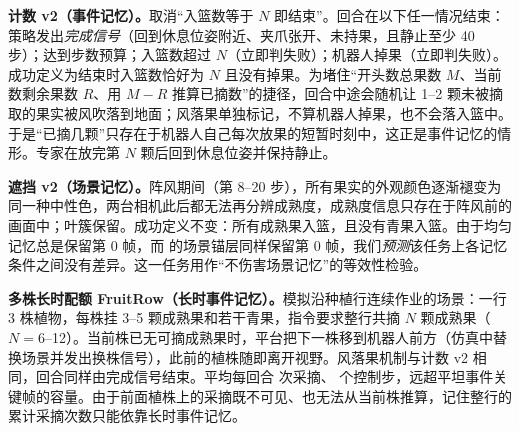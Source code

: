 \textbf{计数 v2（事件记忆）。}取消“入篮数等于 $N$ 即结束”。回合在以下任一情况结束：策略发出\emph{完成信号}（回到休息位姿附近、夹爪张开、未持果，且静止至少 40 步）；达到步数预算；入篮数超过 $N$（立即判失败）；机器人掉果（立即判失败）。成功定义为结束时入篮数恰好为 $N$ 且没有掉果。为堵住“开头数总果数 $M$、当前数剩余果数 $R$、用 $M-R$ 推算已摘数”的捷径，回合中途会随机让 1--2 颗未被摘取的果实被风吹落到地面；风落果单独标记，不算机器人掉果，也不会落入篮中。于是“已摘几颗”只存在于机器人自己每次放果的短暂时刻中，这正是事件记忆的情形。专家在放完第 $N$ 颗后回到休息位姿并保持静止。

\textbf{遮挡 v2（场景记忆）。}阵风期间（第 8--20 步），所有果实的外观颜色逐渐褪变为同一种中性色，两台相机此后都无法再分辨成熟度，成熟度信息只存在于阵风前的画面中；叶簇保留。成功定义不变：所有成熟果入篮，且没有青果入篮。由于均匀记忆总是保留第 0 帧，而 \hem{} 的场景锚层同样保留第 0 帧，我们\emph{预测}该任务上各记忆条件之间没有差异。这一任务用作“不伤害场景记忆”的等效性检验。

\textbf{多株长时配额 FruitRow（长时事件记忆）。}模拟沿种植行连续作业的场景：一行 3 株植物，每株挂 3--5 颗成熟果和若干青果，指令要求整行共摘 $N$ 颗成熟果（$N=6$--12）。当前株已无可摘成熟果时，平台把下一株移到机器人前方（仿真中替换场景并发出换株信号），此前的植株随即离开视野。风落果机制与计数 v2 相同，回合同样由完成信号结束。平均每回合  次采摘、 个控制步，远超平坦事件关键帧的容量。由于前面植株上的采摘既不可见、也无法从当前株推算，记住整行的累计采摘次数只能依靠长时事件记忆。

